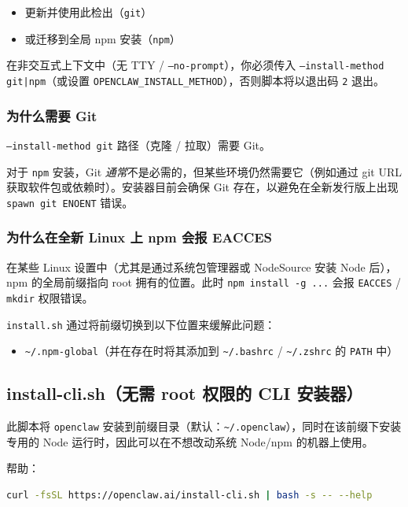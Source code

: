\begin{itemize}
  \item 更新并使用此检出（\texttt{git}）
  \item 或迁移到全局 npm 安装（\texttt{npm}）
\end{itemize}


在非交互式上下文中（无 TTY / \texttt{--no-prompt}），你必须传入 \texttt{--install-method git|npm}（或设置 \texttt{OPENCLAW\_INSTALL\_METHOD}），否则脚本将以退出码 \texttt{2} 退出。

\subsubsection{为什么需要 Git}


\texttt{--install-method git} 路径（克隆 / 拉取）需要 Git。

对于 \texttt{npm} 安装，Git \textit{通常}不是必需的，但某些环境仍然需要它（例如通过 git URL 获取软件包或依赖时）。安装器目前会确保 Git 存在，以避免在全新发行版上出现 \texttt{spawn git ENOENT} 错误。

\subsubsection{为什么在全新 Linux 上 npm 会报 EACCES}


在某些 Linux 设置中（尤其是通过系统包管理器或 NodeSource 安装 Node 后），npm 的全局前缀指向 root 拥有的位置。此时 \texttt{npm install -g ...} 会报 \texttt{EACCES} / \texttt{mkdir} 权限错误。

\texttt{install.sh} 通过将前缀切换到以下位置来缓解此问题：

\begin{itemize}
  \item \texttt{\textasciitilde{}/.npm-global}（并在存在时将其添加到 \texttt{\textasciitilde{}/.bashrc} / \texttt{\textasciitilde{}/.zshrc} 的 \texttt{PATH} 中）
\end{itemize}


\subsection{install-cli.sh（无需 root 权限的 CLI 安装器）}


此脚本将 \texttt{openclaw} 安装到前缀目录（默认：\texttt{\textasciitilde{}/.openclaw}），同时在该前缀下安装专用的 Node 运行时，因此可以在不想改动系统 Node/npm 的机器上使用。

帮助：

\begin{lstlisting}[language=bash]
curl -fsSL https://openclaw.ai/install-cli.sh | bash -s -- --help
\end{lstlisting}


